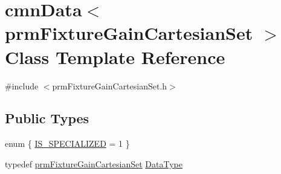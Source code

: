 \hypertarget{classcmn_data_3_01prm_fixture_gain_cartesian_set_01_4}{}\section{cmn\+Data$<$ prm\+Fixture\+Gain\+Cartesian\+Set $>$ Class Template Reference}
\label{classcmn_data_3_01prm_fixture_gain_cartesian_set_01_4}


{\ttfamily \#include $<$prm\+Fixture\+Gain\+Cartesian\+Set.\+h$>$}

\subsection*{Public Types}
\begin{DoxyCompactItemize}
\item 
enum \{ \hyperlink{classcmn_data_3_01prm_fixture_gain_cartesian_set_01_4_aee948705f580f6615419227b74f70d81a85ef12a82d88c8ec41c20dd41cb630c4}{I\+S\+\_\+\+S\+P\+E\+C\+I\+A\+L\+I\+Z\+E\+D} = 1
 \}
\item 
typedef \hyperlink{classprm_fixture_gain_cartesian_set}{prm\+Fixture\+Gain\+Cartesian\+Set} \hyperlink{classcmn_data_3_01prm_fixture_gain_cartesian_set_01_4_acc465bb24d169f220385b16e38a8e7ea}{Data\+Type}
\end{DoxyCompactItemize}
